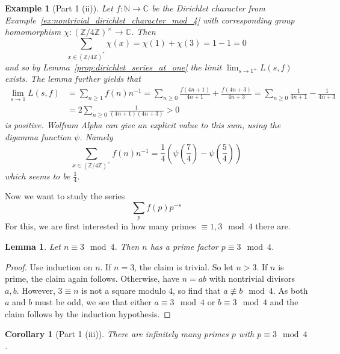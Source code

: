 \documentclass{scrartcl}
\newcommand{\N}{\mathbb{N}}
\newcommand{\Z}{\mathbb{Z}}
\newcommand{\C}{\mathbb{C}}
\newcommand{\units}{\times}
\newtheorem{lemma}[definition]{Lemma}
\newtheorem{example}[definition]{Example}
\newtheorem{corollary}[definition]{Corollary}
\begin{document}
\begin{example}[Part 1 (ii)]
    Let $f: \N \to \C$ be the Dirichlet character from Example~\ref{ex:nontrivial_dirichlet_character_mod_4} with corresponding group homomorphism $\chi: (\Z/4\Z)^\units \to \C$.
    Then
    \begin{equation*}
        \sum_{x \in (\Z/4\Z)^*} \chi(x) = \chi(1) + \chi(3) = 1 - 1 = 0
    \end{equation*}
    and so by Lemma~\ref{prop:dirichlet_series_at_one} the limit $\lim_{s \to 1^+} L(s, f)$ exists.
    The lemma further yields that
    \begin{align*}
        \lim_{s \to 1} L(s, f) &= \sum_{n \geq 1} f(n) n^{-1} = \sum_{n \geq 0} \frac {f(4n + 1)} {4n + 1} + \frac {f(4n + 3)} {4n + 3} = \sum_{n \geq 0} \frac 1 {4n + 1} - \frac 1 {4n + 3} \\
        &= 2 \sum_{n \geq 0} \frac 1 {(4n + 1)(4n + 3)} > 0
    \end{align*}
    is positive. 
    Wolfram Alpha \cite{wolfram_alpha} can give an explicit value to this sum, using the digamma function $\psi$. Namely
    \begin{equation*}
        \sum_{x \in (\Z/4\Z)^\units} f(n) n^{-1} = \frac 1 4 (\psi(\frac 7 4) - \psi(\frac 5 4))
    \end{equation*}
    which seems to be $\frac 1 4$.
\end{example}
Now we want to study the series
\begin{equation*}
    \sum_p f(p) p^{-s}
\end{equation*}
For this, we are first interested in how many primes $\equiv 1, 3 \mod 4$ there are.
\begin{lemma}
    \label{prop:prime_factor_3_mod_4}
    Let $n \equiv 3 \mod 4$. Then $n$ has a prime factor $p \equiv 3 \mod 4$.
\end{lemma}
\begin{proof}
    Use induction on $n$.
    If $n = 3$, the claim is trivial. 
    So let $n > 3$. If $n$ is prime, the claim again follows.
    Otherwise, have $n = ab$ with nontrivial divisors $a, b$.
    However, $3 \equiv n$ is not a square modulo $4$, so find that $a \not\equiv b \mod 4$.
    As both $a$ and $b$ must be odd, we see that either $a \equiv 3 \mod 4$ or $b \equiv 3 \mod 4$ and the claim follows by the induction hypothesis.
\end{proof}
\begin{corollary}[Part 1 (iii)]
    There are infinitely many primes $p$ with $p \equiv 3 \mod 4$.
\end{corollary}
\end{document}
